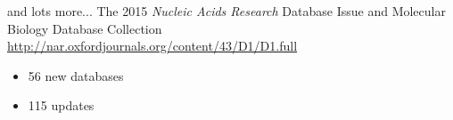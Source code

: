 \documentclass[pdf]{beamer}
\begin{document}
\begin{frame}{and lots more...}
  The 2015 \emph{Nucleic Acids Research} Database Issue
  and Molecular Biology Database Collection\\
  {\small
    \url{http://nar.oxfordjournals.org/content/43/D1/D1.full}
  }

  \begin{itemize}
  \item 56 new databases
  \item 115 updates
  \end{itemize}
  
\end{frame}
\end{document}
